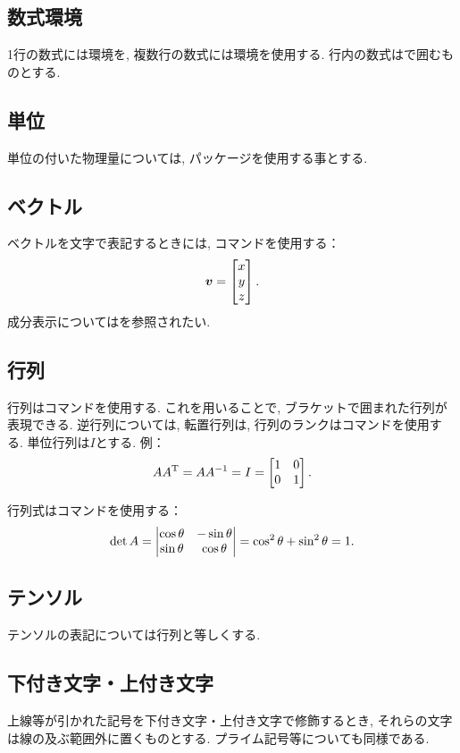 \documentclass[uplatex,a4j,twocolumn]{jsarticle}
\begin{document}
	\subsection{数式環境}
		1行の数式には環境を, 複数行の数式には環境を使用する. 行内の数式は\code{\$}で囲むものとする.
	\subsection{単位}
		単位の付いた物理量については, パッケージを使用する事とする.
	\subsection{ベクトル}
		ベクトルを文字で表記するときには, コマンドを使用する：
		\begin{equation}
			\bm{v} = \begin{bmatrix} x \\ y \\ z \end{bmatrix}.
		\end{equation}
		成分表示についてはを参照されたい.
	\subsection{行列}
		行列はコマンドを使用する. これを用いることで, ブラケットで囲まれた行列が表現できる. 逆行列については, 転置行列は, 行列のランクはコマンドを使用する. 単位行列は$I$とする. 例：
		\begin{equation}
			A A^{\mathrm{T}} = A A^{-1} = I = \begin{bmatrix} 1 & 0 \\ 0 & 1 \end{bmatrix}.
		\end{equation}
		
		行列式はコマンドを使用する：
		\begin{equation}
			\det{A} = \begin{vmatrix} \cos{\theta} & -\sin{\theta} \\ \sin{\theta} & \cos{\theta} \end{vmatrix} = \cos^2{\theta} + \sin^2{\theta} = 1.
		\end{equation}
	\subsection{テンソル}
		テンソルの表記については行列と等しくする.
	\subsection{下付き文字・上付き文字}
		上線等が引かれた記号を下付き文字・上付き文字で修飾するとき, それらの文字は線の及ぶ範囲外に置くものとする. プライム記号等についても同様である. 

\balance
\end{document}
